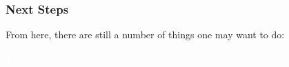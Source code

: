 \documentclass{beamer}
\begin{document}
\begin{frame}
  \frametitle{Next Steps}
  From here, there are still a number of things one may want to do:
\end{frame}

\bgroup
{}
\begin{frame}[t,plain]{}{}
  \begin{center}
    {\tiny \textcolor{white}{The End}}
  \end{center}
\end{frame}
\egroup
\end{document}
